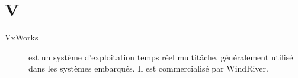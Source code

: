  \section{V}

\begin{description}

    \item[VxWorks] est un système d'exploitation temps réel multitâche, généralement utilisé dans les systèmes embarqués.
Il est commercialisé par WindRiver.

\end{description}
